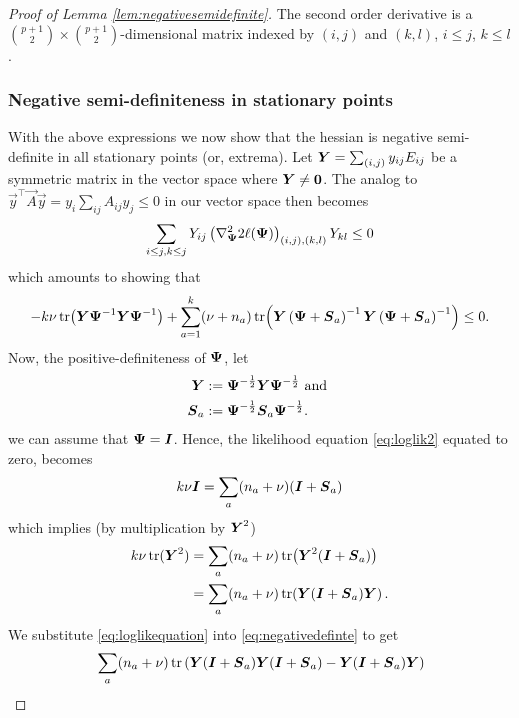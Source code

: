 \documentclass{article}\usepackage[]{graphicx}\usepackage[]{color}
\begin{document}
\begin{proof}[Proof of Lemma \ref{lem:negativesemidefinite}]
The second order derivative is a $\binom{p+1}{2} \times \binom{p+1}{2}$-dimensional matrix indexed by $(i,j)$ and $(k,l)$, $i \leq j$, $k \leq l$.




\subsubsection*{Negative semi-definiteness in stationary points}
With the above expressions we now show that the hessian is negative semi-definite in all stationary points (or, extrema).
Let ${\boldsymbol{Y}} = \sum_{(i,j)} y_{ij}E_{ij}$ be a symmetric matrix in the vector space where ${\boldsymbol{Y}} \neq \boldsymbol{0}$. The analog to $\vec{y}^\top \vec{A}\vec{y} = y_i \sum_{ij} A_{ij} y_j \leq 0$ in our vector space then becomes
\begin{align*}
  \sum_{i\leq j, k\leq j}
    Y_{ij}
    \left(\nabla^2_{\boldsymbol{\Psi}} 2\ell({\boldsymbol{\Psi}})\right)_{(i,j),(k,l)}
    Y_{kl} \leq 0
\end{align*}
which amounts to showing that
\small
\begin{align}
- k\nu\operatorname*{tr}\!\left( {\boldsymbol{Y}}{\boldsymbol{\Psi}}^{-1} {\boldsymbol{Y}}{\boldsymbol{\Psi}}^{-1} \right)
+ \sum_{a = 1}^k (\nu + n_a)
    \operatorname*{tr}\!\left(
      {\boldsymbol{Y}}\left({\boldsymbol{\Psi}} + {\boldsymbol{S}}_a\right)^{-1}
      {\boldsymbol{Y}}\left({\boldsymbol{\Psi}} + {\boldsymbol{S}}_a\right)^{-1}
    \right) \leq 0.
  \label{eq:negativedefinte}
\end{align}
\normalsize
Now, the positive-definiteness of ${\boldsymbol{\Psi}}$, let
\begin{align*}
  {\boldsymbol{Y}} &:= {\boldsymbol{\Psi}}^{-\frac{1}{2}} {\boldsymbol{Y}} {\boldsymbol{\Psi}}^{-\frac{1}{2}} \text{ and } \\
  {\boldsymbol{S}}_a &:= {\boldsymbol{\Psi}}^{-\frac{1}{2}} {\boldsymbol{S}}_a  {\boldsymbol{\Psi}}^{-\frac{1}{2}}.
\end{align*}
we can assume that ${\boldsymbol{\Psi}} = {\boldsymbol{I}}$. Hence, the likelihood equation \eqref{eq:loglik2} equated to zero, becomes
\begin{align*}
  k\nu{\boldsymbol{I}} = \sum_a(n_a + \nu)({\boldsymbol{I}} + {\boldsymbol{S}}_a)
\end{align*}
which implies (by multiplication by ${\boldsymbol{Y}}^2$)
\begin{align}
  k\nu\operatorname*{tr}({\boldsymbol{Y}}^2)
  &= \sum_a (n_a + \nu)\operatorname*{tr}\!\left({\boldsymbol{Y}}^2({\boldsymbol{I}} + {\boldsymbol{S}}_a)\right) \notag\\
  &= \sum_a (n_a + \nu)\operatorname*{tr}\!\left({\boldsymbol{Y}}({\boldsymbol{I}} + {\boldsymbol{S}}_a){\boldsymbol{Y}}\right).
  \label{eq:loglikequation}
\end{align}
We substitute \eqref{eq:loglikequation} into \eqref{eq:negativedefinte} to get
\begin{align*}
  &\sum_a (n_a + \nu)\tr\left(\vY (\vI + \vS_a) \vY (\vI + \vS_a) - \vY (\vI + \vS_a) \vY \right) \\

\end{align*}
\end{proof}
\end{document}
